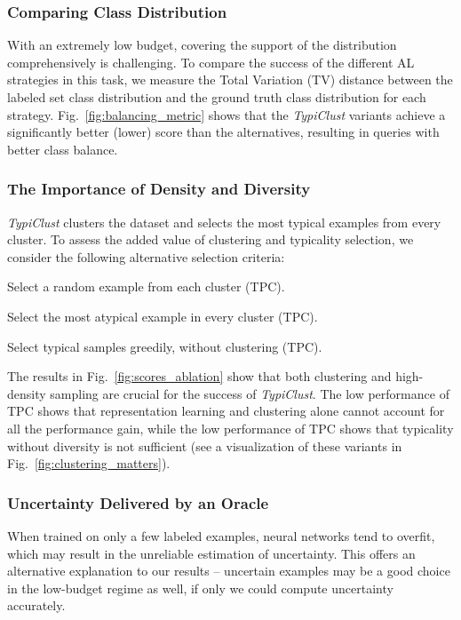 \documentclass{article}
\begin{document}
\subsubsection{Comparing Class Distribution}
\label{sec:class_balancing}
With an extremely low budget, covering the support of the distribution comprehensively is challenging. To compare the success of the different AL strategies in this task, we measure the Total Variation (TV) distance between the labeled set class distribution and the ground truth class distribution for each strategy. Fig.~\ref{fig:balancing_metric} shows that the \emph{TypiClust} variants achieve a significantly better (lower) score than the alternatives, resulting in queries with better class balance.


\subsubsection{The Importance of Density and Diversity}
\label{sec:abb-denisity}
\emph{TypiClust} clusters the dataset and selects the most typical examples from every cluster. To assess the added value of clustering and typicality selection, we consider the following alternative selection criteria:
\begin{inparaenum}[(a)]
    \item Select a random example from each cluster (TPC).
    \item Select the most atypical example in every cluster (TPC).
    \item Select typical samples greedily, without clustering (TPC).
\end{inparaenum}

The results in Fig.~\ref{fig:scores_ablation} show that both clustering and high-density sampling are crucial for the success of \emph{TypiClust}. The low performance of TPC shows that representation learning and clustering alone cannot account for all the performance gain, while the low performance of TPC shows that typicality without diversity is not sufficient (see a  visualization of these variants in Fig.~\ref{fig:clustering_matters}).

\subsubsection{Uncertainty Delivered by an Oracle}
\label{sec:ablation_oracle_uncertainty}

When trained on only a few labeled examples, neural networks tend to overfit, which may result in the unreliable estimation of uncertainty. This offers an alternative explanation to our results -- uncertain examples may be a good choice in the low-budget regime as well, if only we could compute uncertainty accurately.
\end{document}
